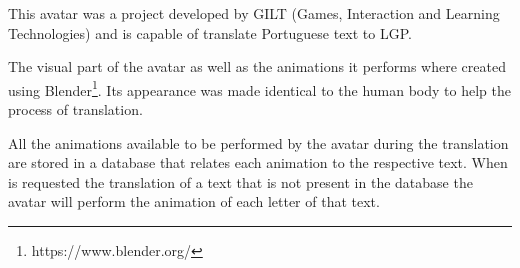 This avatar was a project developed by GILT (Games, Interaction and Learning Technologies) and is capable of translate Portuguese text to \gls{LGP}.

The visual part of the avatar as well as the animations it performs where created using Blender\footnote{https://www.blender.org/}.
Its appearance  was made identical to the human body to help the process of translation\cite{escudeiro2015virtual}.

All the animations available to be performed by the avatar during the translation are stored in a database that relates each animation to the respective text.
When is requested the translation of a text that is not present in the database the avatar will perform the animation of each letter of that text.
